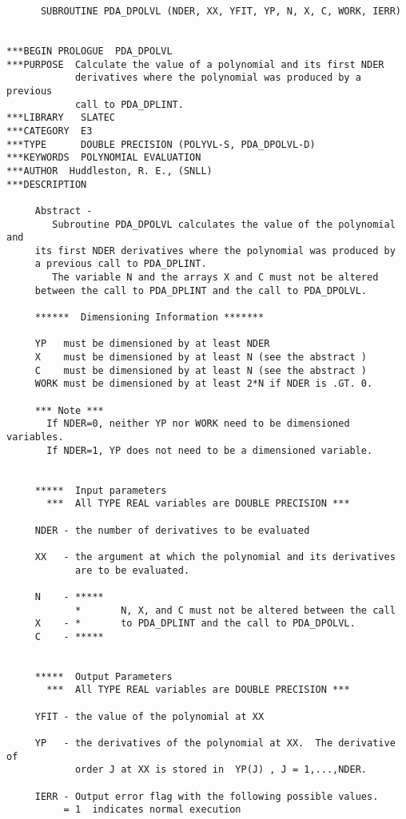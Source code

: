 \begin{verbatim}
      SUBROUTINE PDA_DPOLVL (NDER, XX, YFIT, YP, N, X, C, WORK, IERR)


***BEGIN PROLOGUE  PDA_DPOLVL
***PURPOSE  Calculate the value of a polynomial and its first NDER
            derivatives where the polynomial was produced by a previous
            call to PDA_DPLINT.
***LIBRARY   SLATEC
***CATEGORY  E3
***TYPE      DOUBLE PRECISION (POLYVL-S, PDA_DPOLVL-D)
***KEYWORDS  POLYNOMIAL EVALUATION
***AUTHOR  Huddleston, R. E., (SNLL)
***DESCRIPTION

     Abstract -
        Subroutine PDA_DPOLVL calculates the value of the polynomial and
     its first NDER derivatives where the polynomial was produced by
     a previous call to PDA_DPLINT.
        The variable N and the arrays X and C must not be altered
     between the call to PDA_DPLINT and the call to PDA_DPOLVL.

     ******  Dimensioning Information *******

     YP   must be dimensioned by at least NDER
     X    must be dimensioned by at least N (see the abstract )
     C    must be dimensioned by at least N (see the abstract )
     WORK must be dimensioned by at least 2*N if NDER is .GT. 0.

     *** Note ***
       If NDER=0, neither YP nor WORK need to be dimensioned variables.
       If NDER=1, YP does not need to be a dimensioned variable.


     *****  Input parameters
       ***  All TYPE REAL variables are DOUBLE PRECISION ***

     NDER - the number of derivatives to be evaluated

     XX   - the argument at which the polynomial and its derivatives
            are to be evaluated.

     N    - *****
            *       N, X, and C must not be altered between the call
     X    - *       to PDA_DPLINT and the call to PDA_DPOLVL.
     C    - *****


     *****  Output Parameters
       ***  All TYPE REAL variables are DOUBLE PRECISION ***

     YFIT - the value of the polynomial at XX

     YP   - the derivatives of the polynomial at XX.  The derivative of
            order J at XX is stored in  YP(J) , J = 1,...,NDER.

     IERR - Output error flag with the following possible values.
          = 1  indicates normal execution


\end{verbatim}
